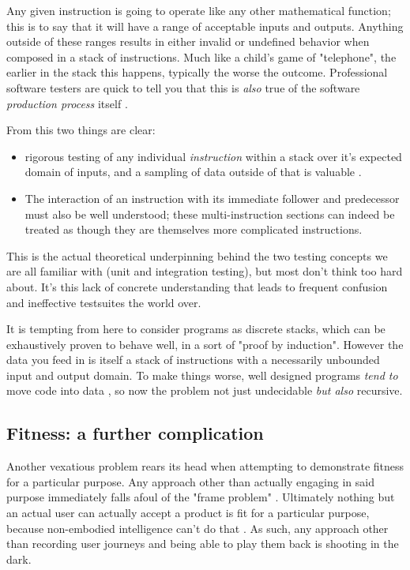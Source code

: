 \documentclass{article}
\begin{document}
Any given instruction is going to operate like any other mathematical function;
this is to say that it will have a range of acceptable inputs and outputs.
Anything outside of these ranges results in either invalid or undefined behavior when composed in a stack of instructions.
Much like a child's game of "telephone", the earlier in the stack this happens, typically the worse the outcome.
Professional software testers are quick to tell you that this is \textit{also} true of the software \textit{production process} itself \cite{prodprop}.

From this two things are clear:
\begin{itemize}
\item rigorous testing of any individual \textit{instruction} within a stack over it's expected domain of inputs, and a sampling of data outside of that is valuable \cite{bezier2}.
\item The interaction of an instruction with its immediate follower and predecessor must also be well understood; these multi-instruction sections can indeed be treated as though they are themselves more complicated instructions.
\end{itemize}
This is the actual theoretical underpinning behind the two testing concepts we are all familiar with (unit and integration testing), but most don't think too hard about.
It's this lack of concrete understanding that leads to frequent confusion and ineffective testsuites the world over.

It is tempting from here to consider programs as discrete stacks, which can be exhaustively proven to behave well, in a sort of "proof by induction".
However the data you feed in is itself a stack of instructions with a necessarily unbounded input and output domain.
To make things worse, well designed programs \textit{tend to} move code into data \cite{bezier3}, so now the problem not just undecidable \cite{turing} \textit{but also} recursive.

\subsection{Fitness: a further complication}

Another vexatious problem rears its head when attempting to demonstrate fitness for a particular purpose.
Any approach other than actually engaging in said purpose immediately falls afoul of the "frame problem" \cite{frame}.
Ultimately nothing but an actual user can actually accept a product is fit for a particular purpose, because non-embodied intelligence can't do that \cite{chapman}.
As such, any approach other than recording user journeys and being able to play them back is shooting in the dark.
\end{document}
